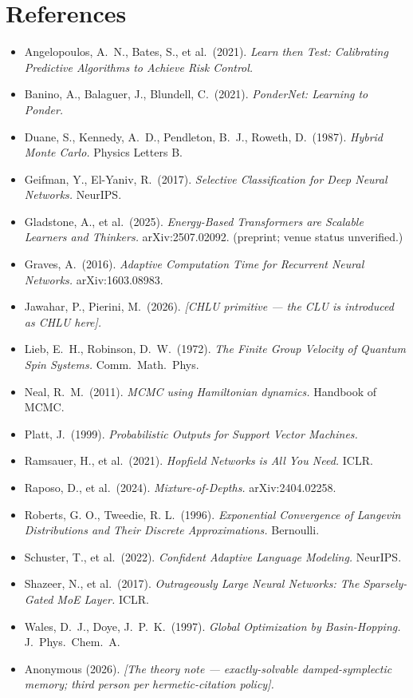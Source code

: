\documentclass[11pt]{article}
\begin{document}
\section*{References}
\small
\begin{itemize}\itemsep0pt
\item Angelopoulos, A.~N., Bates, S., et al.\ (2021). \emph{Learn then Test: Calibrating Predictive Algorithms to Achieve Risk Control.}
\item Banino, A., Balaguer, J., Blundell, C.\ (2021). \emph{PonderNet: Learning to Ponder.}
\item Duane, S., Kennedy, A.~D., Pendleton, B.~J., Roweth, D.\ (1987). \emph{Hybrid Monte Carlo.} Physics Letters B.
\item Geifman, Y., El-Yaniv, R.\ (2017). \emph{Selective Classification for Deep Neural Networks.} NeurIPS.
\item Gladstone, A., et al.\ (2025). \emph{Energy-Based Transformers are Scalable Learners and Thinkers.} arXiv:2507.02092. (preprint; venue status unverified.)
\item Graves, A.\ (2016). \emph{Adaptive Computation Time for Recurrent Neural Networks.} arXiv:1603.08983.
\item Jawahar, P., Pierini, M.\ (2026). \emph{[CHLU primitive --- the CLU is introduced as CHLU here].}
\item Lieb, E.~H., Robinson, D.~W.\ (1972). \emph{The Finite Group Velocity of Quantum Spin Systems.} Comm.\ Math.\ Phys.
\item Neal, R.~M.\ (2011). \emph{MCMC using Hamiltonian dynamics.} Handbook of MCMC.
\item Platt, J.\ (1999). \emph{Probabilistic Outputs for Support Vector Machines.}
\item Ramsauer, H., et al.\ (2021). \emph{Hopfield Networks is All You Need.} ICLR.
\item Raposo, D., et al.\ (2024). \emph{Mixture-of-Depths.} arXiv:2404.02258.
\item Roberts, G. O., Tweedie, R. L.\ (1996). \emph{Exponential Convergence of Langevin Distributions and Their Discrete Approximations.} Bernoulli.
\item Schuster, T., et al.\ (2022). \emph{Confident Adaptive Language Modeling.} NeurIPS.
\item Shazeer, N., et al.\ (2017). \emph{Outrageously Large Neural Networks: The Sparsely-Gated MoE Layer.} ICLR.
\item Wales, D.~J., Doye, J.~P.~K.\ (1997). \emph{Global Optimization by Basin-Hopping.} J.\ Phys.\ Chem.\ A.
\item Anonymous (2026). \emph{[The theory note --- exactly-solvable damped-symplectic memory; third person per hermetic-citation policy].}
\end{itemize}
\end{document}
